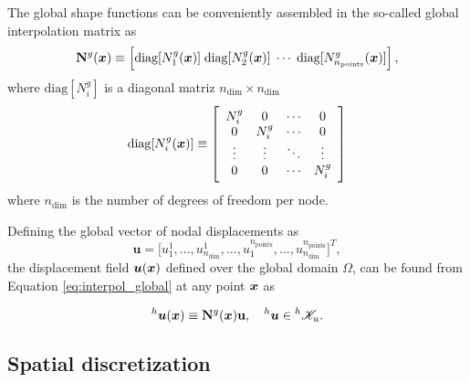 The global shape functions can be conveniently assembled in the so-called global interpolation matrix as
\begin{equation}
    \mathbf N^g(\bm{x}) \equiv \left[\text{diag}[N_1^g(\bm{x})]\; \text{diag}[N_2^g(\bm{x})]\;\cdots\; \text{diag}[N_{n_\text{points}}^g(\bm{x})]\right],
\end{equation}
where $\text{diag}[N_i^g]$ is a diagonal matriz $n_\text{dim} \times n_\text{dim}$
\begin{equation}
    \text{diag}[N_i^g(\bm{x})]\equiv \left[
    \begin{array}{cccc}
         N_i^g & 0 & \cdots & 0  \\
         0     & N_i^g & \cdots & 0 \\
         \vdots & \vdots & \ddots & \vdots \\
         0 & 0 & \cdots & N_i^g
    \end{array}
    \right]
\end{equation}
where $n_\text{dim}$ is the number of degrees of freedom per node.

Defining the global vector of nodal displacements as
\begin{equation}
    \mathbf u = \Big[ u_1^1,\dots,u^1_{n_\text{dim}},\dots, u_1^{n_\text{points}},\dots,u^{n_\text{points}}_{n_\text{dim}}\Big]^T,
\end{equation}
the displacement field $\bm u(\bm{x})$ defined over the global domain $\Omega$, can be found from Equation \eqref{eq:interpol_global} at any point $\bm{x}$ as
\begin{highlight}
    \begin{equation}
        ^h\bm{u}(\bm{x}) \equiv \mathbf N^g(\bm{x})\mathbf u,\quad {}^h\bm{u}\in {}^h\mathscr{K}_u.
    \end{equation}
\end{highlight}

\subsection{Spatial discretization} \label{sec:spatial_discretization}

